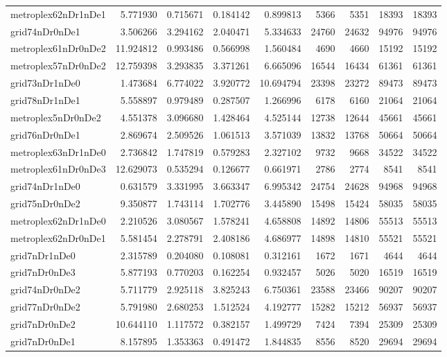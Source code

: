 \begin{longtable}{|l|r|r|r|r|r|r|r|r|}
metroplex62nDr1nDe1 & 5.771930 & 0.715671 & 0.184142 & 0.899813 & 5366 & 5351 & 18393 & 18393 \\
grid74nDr0nDe1 & 3.506266 & 3.294162 & 2.040471 & 5.334633 & 24760 & 24632 & 94976 & 94976 \\
metroplex61nDr0nDe2 & 11.924812 & 0.993486 & 0.566998 & 1.560484 & 4690 & 4660 & 15192 & 15192 \\
metroplex57nDr0nDe2 & 12.759398 & 3.293835 & 3.371261 & 6.665096 & 16544 & 16434 & 61361 & 61361 \\
grid73nDr1nDe0 & 1.473684 & 6.774022 & 3.920772 & 10.694794 & 23398 & 23272 & 89473 & 89473 \\
grid78nDr1nDe1 & 5.558897 & 0.979489 & 0.287507 & 1.266996 & 6178 & 6160 & 21064 & 21064 \\
metroplex5nDr0nDe2 & 4.551378 & 3.096680 & 1.428464 & 4.525144 & 12738 & 12644 & 45661 & 45661 \\
grid76nDr0nDe1 & 2.869674 & 2.509526 & 1.061513 & 3.571039 & 13832 & 13768 & 50664 & 50664 \\
metroplex63nDr1nDe0 & 2.736842 & 1.747819 & 0.579283 & 2.327102 & 9732 & 9668 & 34522 & 34522 \\
metroplex61nDr0nDe3 & 12.629073 & 0.535294 & 0.126677 & 0.661971 & 2786 & 2774 & 8541 & 8541 \\
grid74nDr1nDe0 & 0.631579 & 3.331995 & 3.663347 & 6.995342 & 24754 & 24628 & 94968 & 94968 \\
grid75nDr0nDe2 & 9.350877 & 1.743114 & 1.702776 & 3.445890 & 15498 & 15424 & 58035 & 58035 \\
metroplex62nDr1nDe0 & 2.210526 & 3.080567 & 1.578241 & 4.658808 & 14892 & 14806 & 55513 & 55513 \\
metroplex62nDr0nDe1 & 5.581454 & 2.278791 & 2.408186 & 4.686977 & 14898 & 14810 & 55521 & 55521 \\
grid7nDr1nDe0 & 2.315789 & 0.204080 & 0.108081 & 0.312161 & 1672 & 1671 & 4644 & 4644 \\
grid7nDr0nDe3 & 5.877193 & 0.770203 & 0.162254 & 0.932457 & 5026 & 5020 & 16519 & 16519 \\
grid74nDr0nDe2 & 5.711779 & 2.925118 & 3.825243 & 6.750361 & 23588 & 23466 & 90207 & 90207 \\
grid77nDr0nDe2 & 5.791980 & 2.680253 & 1.512524 & 4.192777 & 15282 & 15212 & 56937 & 56937 \\
grid7nDr0nDe2 & 10.644110 & 1.117572 & 0.382157 & 1.499729 & 7424 & 7394 & 25309 & 25309 \\
grid7nDr0nDe1 & 8.157895 & 1.353363 & 0.491472 & 1.844835 & 8556 & 8520 & 29694 & 29694 \\

\end{longtable}
